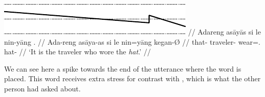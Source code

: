 \ex\begingl
	\glpreamble \raisebox{-1.5em}
		{\includegraphics{images/contours-contrast.pdf}} //
	\gla Adareng asāyās si le nin-yāng . //
	\glb Ada-reng asāya-as si le nin=yāng kegan-Ø //
	\glc that-\AargI{} traveler-\Parg{} \Rel{} \PatTI{} wear=\TsgM{}.\Aarg{} 
		hat-\Top{} //
	\glft `It is the traveler who wore the \emph{hat}.' //
\endgl\xe

We can see here a spike towards the end of the utterance where the word 
 is placed. This word receives extra stress for 
contrast with , which is what the other person had asked 
about.
